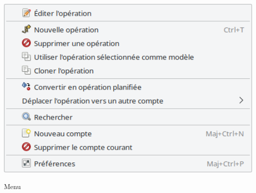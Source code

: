 \begin{minipage}{.3\linewidth}
	\vspace{-5pt}					%
	\centering						%
	\includegraphics[width=1\textwidth]{image/screenshot/home_menubar_edit}
	\vspace{-15pt}					%
	\captionsetup{
		type=figure,%
		name=Fig.,%
		labelsep=newline}			%
	\caption{Menu }	%
	\label{home_menubar_edit}
\end{minipage}


